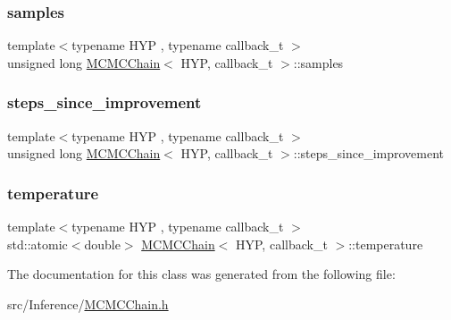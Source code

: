 \mbox{\label{class_m_c_m_c_chain_a0d3ac649b04077cd0ffea236df560c91}} 
\subsubsection{\texorpdfstring{samples}{samples}}
{\footnotesize\ttfamily template$<$typename H\+YP , typename callback\+\_\+t $>$ \\
unsigned long \hyperlink{class_m_c_m_c_chain}{M\+C\+M\+C\+Chain}$<$ H\+YP, callback\+\_\+t $>$\+::samples}

\mbox{\label{class_m_c_m_c_chain_aeac1cd63d13c397ba01cca35b605b786}} 
\subsubsection{\texorpdfstring{steps\+\_\+since\+\_\+improvement}{steps\_since\_improvement}}
{\footnotesize\ttfamily template$<$typename H\+YP , typename callback\+\_\+t $>$ \\
unsigned long \hyperlink{class_m_c_m_c_chain}{M\+C\+M\+C\+Chain}$<$ H\+YP, callback\+\_\+t $>$\+::steps\+\_\+since\+\_\+improvement}

\mbox{\label{class_m_c_m_c_chain_a7173287e1c0e681a9912a84c87320ece}} 
\subsubsection{\texorpdfstring{temperature}{temperature}}
{\footnotesize\ttfamily template$<$typename H\+YP , typename callback\+\_\+t $>$ \\
std\+::atomic$<$double$>$ \hyperlink{class_m_c_m_c_chain}{M\+C\+M\+C\+Chain}$<$ H\+YP, callback\+\_\+t $>$\+::temperature}



The documentation for this class was generated from the following file\+:\begin{DoxyCompactItemize}
\item 
src/\+Inference/\hyperlink{_m_c_m_c_chain_8h}{M\+C\+M\+C\+Chain.\+h}\end{DoxyCompactItemize}
